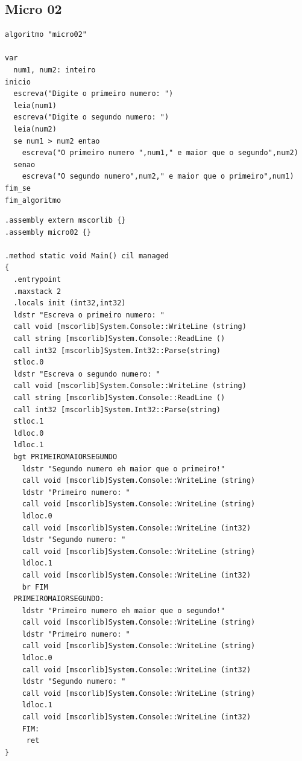 \documentclass[hidelinks,12pt]{article}
\begin{document}
\subsection{Micro 02}


\begin{lstlisting}[caption=Ler dois inteiros e decide qual é maior(Portugol)]
algoritmo "micro02"

var
  num1, num2: inteiro
inicio
  escreva("Digite o primeiro numero: ")
  leia(num1)
  escreva("Digite o segundo numero: ")
  leia(num2)
  se num1 > num2 entao
    escreva("O primeiro numero ",num1," e maior que o segundo",num2)
  senao
    escreva("O segundo numero",num2," e maior que o primeiro",num1)
fim_se
fim_algoritmo
\end{lstlisting}

\begin{lstlisting}[caption=Ler dois inteiros e decide qual é maior(CIL)]
.assembly extern mscorlib {}
.assembly micro02 {}

.method static void Main() cil managed
{
  .entrypoint
  .maxstack 2
  .locals init (int32,int32)
  ldstr "Escreva o primeiro numero: "
  call void [mscorlib]System.Console::WriteLine (string)
  call string [mscorlib]System.Console::ReadLine ()
  call int32 [mscorlib]System.Int32::Parse(string)
  stloc.0
  ldstr "Escreva o segundo numero: " 
  call void [mscorlib]System.Console::WriteLine (string)
  call string [mscorlib]System.Console::ReadLine ()
  call int32 [mscorlib]System.Int32::Parse(string)
  stloc.1
  ldloc.0
  ldloc.1
  bgt PRIMEIROMAIORSEGUNDO
    ldstr "Segundo numero eh maior que o primeiro!"
    call void [mscorlib]System.Console::WriteLine (string)
    ldstr "Primeiro numero: "
    call void [mscorlib]System.Console::WriteLine (string)
    ldloc.0
    call void [mscorlib]System.Console::WriteLine (int32)
    ldstr "Segundo numero: "
    call void [mscorlib]System.Console::WriteLine (string)
    ldloc.1
    call void [mscorlib]System.Console::WriteLine (int32)
    br FIM
  PRIMEIROMAIORSEGUNDO:
    ldstr "Primeiro numero eh maior que o segundo!"
    call void [mscorlib]System.Console::WriteLine (string)
    ldstr "Primeiro numero: "
    call void [mscorlib]System.Console::WriteLine (string)
    ldloc.0
    call void [mscorlib]System.Console::WriteLine (int32)
    ldstr "Segundo numero: "
    call void [mscorlib]System.Console::WriteLine (string)
    ldloc.1
    call void [mscorlib]System.Console::WriteLine (int32)
    FIM:
     ret
}
\end{lstlisting}
\end{document}
